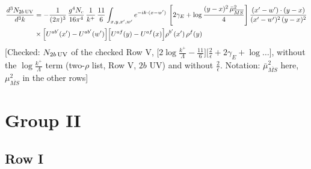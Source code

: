 \documentclass[9pt]{article}
\numberwithin{equation}{section}
\begin{document}
\begin{align} \frac{d^{3}N_{2b\,\rm UV}}{d^{3}k} & =-\frac{1}{(2\pi)^{3}}\,\frac{g^{4}N_{c}}{16\pi^{4}}\,\frac{1}{k^{+}}\,\frac{11}{6}\int_{x,y,x',w'}e^{-ik\cdot(x-w')}\,\left[2\gamma_{E}+\log\frac{(y-x)^{2}\,\bar\mu^{2}_{\overline{MS}}}{4}\right]\frac{(x'-w')\cdot(y-x)}{(x'-w')^{2}\,(y-x)^{2}}\notag \\ & \times\Big[U^{ab'}(x')-U^{ab'}(w')\Big]\Big[U^{af}(y)-U^{af}(x)\Big]\rho^{b'}(x')\,\rho^{f}(y)
\end{align} {\color{red}[Checked: $N_{2b\,\rm UV}$ of the checked Row V, $\big[2\log\frac{k^{+}}{\Lambda}-\frac{11}{6}\big]\big[\frac{2}{\epsilon}+2\gamma_{E}+\log\dots\big]$, without the $\log\frac{k^{+}}{\Lambda}$ term (two-$\rho$ list, Row V, $2b$ UV) and without $\frac{2}{\epsilon}$. Notation: $\bar\mu^{2}_{\overline{MS}}$ here, $\mu^{2}_{\overline{MS}}$ in the other rows]}\par\noindent
\section{Group II}
\subsection{Row I}
\end{document}
